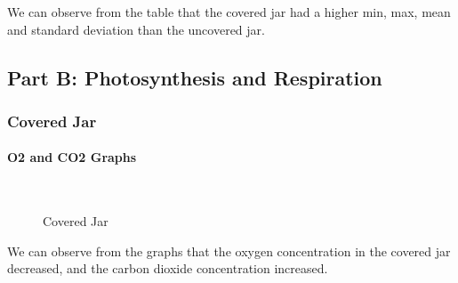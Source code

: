 \documentclass[a4paper, 12pt, english]{article}
\begin{document}
We can observe from the table that the covered jar had a higher min, max, mean
and standard deviation than the uncovered jar.

\subsection{Part B: Photosynthesis and Respiration}
\subsubsection{Covered Jar}
\paragraph{O2 and CO2 Graphs}
\begin{figure}[H]
	\centering
	\\
	\qquad
	\qquad
	\caption{Covered Jar}
	\label{fig:CoveredJar}
\end{figure}

We can observe from the graphs that the oxygen concentration in the covered jar
decreased, and the carbon dioxide concentration increased.
\end{document}
